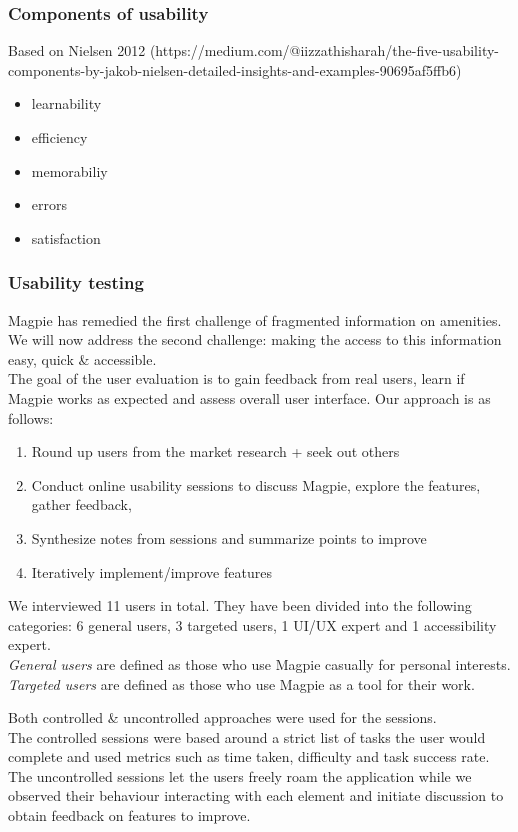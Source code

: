 \subsubsection{Components of usability}
Based on Nielsen 2012 (https://medium.com/@iizzathisharah/the-five-usability-components-by-jakob-nielsen-detailed-insights-and-examples-90695af5ffb6)

\begin{itemize}
    \item learnability
    \item efficiency
    \item memorabiliy
    \item errors
    \item satisfaction
\end{itemize}

\newpage
\subsubsection{Usability testing}
\sloppy
Magpie has remedied the first challenge of fragmented information on amenities. We will now address the second challenge: making the access to this information easy, quick \& accessible.\\

\noindent The goal of the user evaluation is to gain feedback from real users, learn if Magpie works as expected and assess overall user interface. Our approach is as follows:
\begin{enumerate}
    \item Round up users from the market research + seek out others
    \item Conduct online usability sessions to discuss Magpie, explore the features, gather feedback,
    \item Synthesize notes from sessions and summarize points to improve
    \item Iteratively implement/improve features
\end{enumerate}
We interviewed 11 users in total. They have been divided into the following categories: 6 general users, 3 targeted users, 1 UI/UX expert and 1 accessibility expert.\\
\emph{General users} are defined as those who use Magpie casually for personal interests.\\ \emph{Targeted users} are defined as those who use Magpie as a tool for their work.

\noindent Both controlled \& uncontrolled approaches were used for the sessions.\\
The controlled sessions were based around a strict list of tasks the user would complete and used metrics such as time taken, difficulty and task success rate.\\
The uncontrolled sessions let the users freely roam the application while we observed their behaviour interacting with each element and initiate discussion to obtain feedback on features to improve.\\

